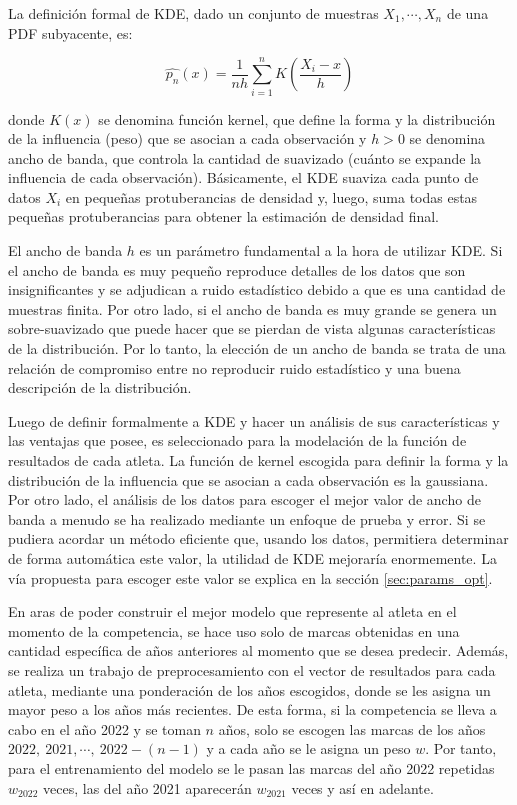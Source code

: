 La definición formal de KDE, dado un conjunto de muestras $ X_1, \cdots, X_n $ de una PDF subyacente, es: 

\begin{equation}
    \label{eq:kde}
    \hat{p_n} (x) = \frac{1}{nh} \sum_{i=1}^{n} K (\frac{X_i - x}{h})
\end{equation}
 
donde $K(x)$ se denomina función kernel, que define la forma y la distribución de la influencia (peso) que se asocian a cada observación y $h > 0$ se denomina ancho de banda, que controla la cantidad de suavizado (cuánto se expande la influencia de cada observación). Básicamente, el KDE suaviza cada punto de datos $X_i$ en pequeñas protuberancias de densidad y, luego, suma todas estas pequeñas protuberancias para obtener la estimación de densidad final.

El ancho de banda $h$ es un parámetro fundamental a la hora de utilizar KDE. Si el ancho de banda es muy pequeño reproduce detalles de los datos que son insignificantes y se adjudican a ruido estadístico debido a que es una cantidad de muestras finita. Por otro lado, si el ancho de banda es muy grande se genera un sobre-suavizado que puede hacer que se pierdan de vista algunas características de la distribución. Por lo tanto, la elección de un ancho de banda se trata de una relación de compromiso entre no reproducir ruido estadístico y una buena descripción de la distribución. 

Luego de definir formalmente a KDE y hacer un análisis de sus características y las ventajas que posee, es seleccionado para la modelación de la función de resultados de cada atleta. La función de kernel escogida para definir la forma y la distribución de la influencia que se asocian a cada observación es la gaussiana. Por otro lado, el análisis de los datos para escoger el mejor valor de ancho de banda a menudo se ha realizado mediante un enfoque de prueba y error. Si se pudiera acordar un método eficiente que, usando los datos, permitiera determinar de forma automática este valor, la utilidad de KDE mejoraría enormemente. La vía propuesta para escoger este valor se explica en la sección \ref{sec:params_opt}.

En aras de poder construir el mejor modelo que represente al atleta en el momento de la competencia, se hace uso solo de marcas obtenidas en una cantidad específica de años anteriores al momento que se desea predecir. Además, se realiza un trabajo de preprocesamiento con el vector de resultados para cada atleta, mediante una ponderación de los años escogidos, donde se les asigna un mayor peso a los años más recientes. De esta forma, si la competencia se lleva a cabo en el año 2022 y se toman $n$ años, solo se escogen las marcas de los años $ 2022,\ 2021, \cdots,\ 2022 - (n-1)$ y a cada año se le asigna un peso $w$. Por tanto, para el entrenamiento del modelo se le pasan las marcas del año 2022 repetidas $w_{2022}$ veces, las del año 2021 aparecerán $w_{2021}$ veces y así en adelante. 

